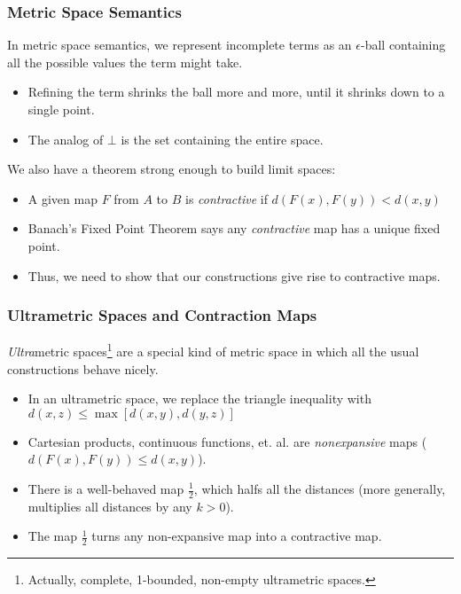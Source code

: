 \documentclass{beamer}
\begin{document}
\begin{frame}
  \frametitle{Metric Space Semantics}
  In metric space semantics, we represent incomplete terms as an
  $\epsilon$-ball containing all the possible values the term might
  take.
  \begin{itemize}
    \item Refining the term shrinks the ball more and more, until it
      shrinks down to a single point.
    \item The analog of $\bot$ is the set containing the entire space.
  \end{itemize}
  We also have a theorem strong enough to build limit spaces:
  \begin{itemize}
    \item A given map $F$ from $A$ to $B$ is \emph{contractive} if
      $d(F(x), F(y)) < d(x, y)$
    \item Banach's Fixed Point Theorem says any \emph{contractive} map has
      a unique fixed point.
    \item Thus, we need to show that our constructions give rise to
      contractive maps.
  \end{itemize}
\end{frame}

\begin{frame}
  \frametitle{Ultrametric Spaces and Contraction Maps}
  \emph{Ultra}metric spaces\footnote{Actually, complete, 1-bounded,
    non-empty ultrametric spaces.} are a special kind of metric space
  in which all the usual constructions behave nicely.
  \begin{itemize}
    \item In an ultrametric space, we replace the triangle inequality
      with $d(x, z) \leq \max[d(x, y), d(y, z)]$
    \item Cartesian products, continuous functions, et. al. are
      \emph{nonexpansive} maps ($d(F(x), F(y)) \leq d(x, y)$).
    \item There is a well-behaved map $\frac{1}{2}$, which halfs all
      the distances (more generally, multiplies all distances by any
      $k > 0$).
    \item The map $\frac{1}{2}$ turns any non-expansive map into a
      contractive map.
  \end{itemize}
\end{frame}
\end{document}
